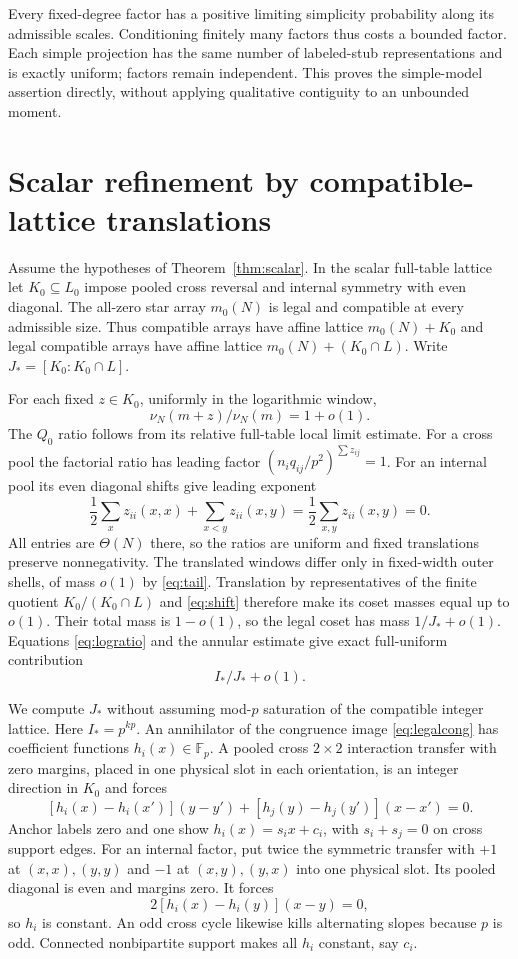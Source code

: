 \documentclass[11pt]{article}
\newcommand{\Fp}{\mathbb F_p}
\begin{document}
Every fixed-degree factor has a positive limiting simplicity probability along its admissible scales. Conditioning finitely many factors thus costs a bounded factor. Each simple projection has the same number of labeled-stub representations and is exactly uniform; factors remain independent. This proves the simple-model assertion directly, without applying qualitative contiguity to an unbounded moment.

\section{Scalar refinement by compatible-lattice translations}
Assume the hypotheses of Theorem~\ref{thm:scalar}. In the scalar full-table lattice let $K_0\subseteq L_0$ impose pooled cross reversal and internal symmetry with even diagonal. The all-zero star array $m_0(N)$ is legal and compatible at every admissible size. Thus compatible arrays have affine lattice $m_0(N)+K_0$ and legal compatible arrays have affine lattice $m_0(N)+(K_0\cap L)$. Write $J_*=[K_0:K_0\cap L]$.

For each fixed $z\in K_0$, uniformly in the logarithmic window,
\begin{equation}\label{eq:shift}
 \nu_N(m+z)/\nu_N(m)=1+o(1).
\end{equation}
The $Q_0$ ratio follows from its relative full-table local limit estimate. For a cross pool the factorial ratio has leading factor $(n_iq_{ij}/p^2)^{\sum z_{ij}}=1$. For an internal pool its even diagonal shifts give leading exponent
\[
 \frac12\sum_x z_{ii}(x,x)+\sum_{x<y}z_{ii}(x,y)
 =\frac12\sum_{x,y}z_{ii}(x,y)=0.
\]
All entries are $\Theta(N)$ there, so the ratios are uniform and fixed translations preserve nonnegativity. The translated windows differ only in fixed-width outer shells, of mass $o(1)$ by \eqref{eq:tail}. Translation by representatives of the finite quotient $K_0/(K_0\cap L)$ and \eqref{eq:shift} therefore make its coset masses equal up to $o(1)$. Their total mass is $1-o(1)$, so the legal coset has mass $1/J_*+o(1)$. Equations \eqref{eq:logratio} and the annular estimate give exact full-uniform contribution
\begin{equation}\label{eq:centralexact}
 I_*/J_*+o(1).
\end{equation}

We compute $J_*$ without assuming mod-$p$ saturation of the compatible integer lattice. Here $I_*=p^{kp}$. An annihilator of the congruence image \eqref{eq:legalcong} has coefficient functions $h_i(x)\in\Fp$. A pooled cross $2\times2$ interaction transfer with zero margins, placed in one physical slot in each orientation, is an integer direction in $K_0$ and forces
\[
 [h_i(x)-h_i(x')](y-y')+[h_j(y)-h_j(y')](x-x')=0.
\]
Anchor labels zero and one show $h_i(x)=s_ix+c_i$, with $s_i+s_j=0$ on cross support edges. For an internal factor, put twice the symmetric transfer with $+1$ at $(x,x),(y,y)$ and $-1$ at $(x,y),(y,x)$ into one physical slot. Its pooled diagonal is even and margins zero. It forces
\[
 2[h_i(x)-h_i(y)](x-y)=0,
\]
so $h_i$ is constant. An odd cross cycle likewise kills alternating slopes because $p$ is odd. Connected nonbipartite support makes all $h_i$ constant, say $c_i$.
\end{document}
